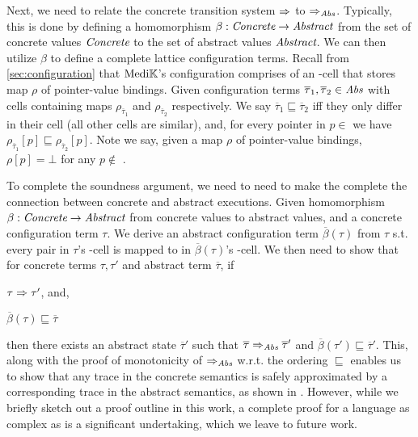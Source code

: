 Next, we need to relate the concrete transition system $\Rightarrow$ to $\Rightarrow_{\textit{Abs}}$.
Typically, this is done by defining a homomorphism $\beta: \textit{Concrete} \to \textit{Abstract}$
from the set of concrete values $\textit{Concrete}$ to the set of abstract values
$\textit{Abstract}$. We can then utilize $\beta$ to define a complete lattice
configuration terms. Recall from \autoref{sec:configuration} that
$\text{Medi}\mathbb{K}{}{}$'s configuration comprises of an -cell that
stores map $\rho$ of pointer-value bindings.
Given configuration terms $\overline{\tau}_1, \overline{\tau}_2 \in
\textit{Abs}$ with  cells containing maps $\rho_{\overline{\tau}_1}$ and
$\rho_{\overline{\tau}_2}$ respectively.
We say $\overline{\tau}_1 \sqsubseteq \overline{\tau}_2$ iff
they only differ in their
 cell (all other cells are similar), and, for every
pointer in $p \in$ 
we have $\rho_{\overline{\tau}_1}[p] \sqsubseteq \rho_{\overline{\tau}_2}[p]$. Note we
say, given a map $\rho$ of pointer-value bindings,
$\rho[p] = \bot$ for any $p \not\in$ .

To complete the soundness argument, we need to need to make the complete the connection
between concrete and abstract executions. Given homomorphism $\beta: \textit{Concrete} \to \textit{Abstract}$
from concrete values to abstract values, and a concrete configuration term
$\tau$. We derive an abstract configuration term $\overline{\beta}\left(\tau\right)$ from $\tau$ s.t.
every  pair in $\tau$'s
-cell is mapped to 
in $\overline{\beta}\left(\tau\right)$'s -cell.
We then need to show that for
concrete terms $\tau, \tau'$ and abstract term $\overline{\tau}$, if
\begin{enumerate*}[label=(\alph*)]
  \item $\tau \Rightarrow \tau'$, and,
  \item $\overline{\beta}\left(\tau\right) \sqsubseteq \overline{\tau}$
\end{enumerate*}
then there exists an abstract state $\overline{\tau}'$ such that
$\overline{\tau} \Rightarrow_{\textit{Abs}} \overline{\tau}'$ and $\overline{\beta}\left(\tau'\right) \sqsubseteq \overline{\tau}'$.
This, along with the proof of monotonicity of $\Rightarrow_{\textit{Abs}}$ w.r.t. the ordering
$\sqsubseteq$ enables us to show that any trace in the concrete semantics is safely approximated
by a corresponding trace in the abstract semantics, as shown in
\cite{SchmidtLISP98}. However, while we briefly sketch out a proof outline
in this work, a complete proof for a language as complex as \MediK{} is a
significant undertaking, which we leave to future work.


